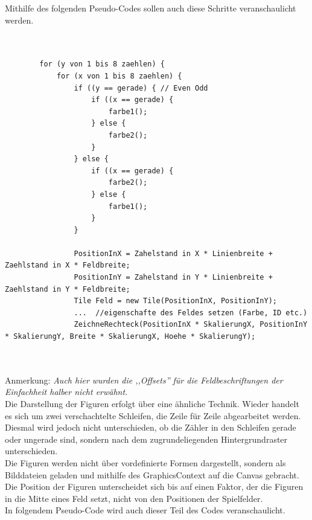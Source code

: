 \documentclass[12pt,a4paper]{article}
\begin{document}
Mithilfe des folgenden Pseudo-Codes sollen auch diese Schritte veranschaulicht werden.
\lstset{language=java}
\begin{lstlisting}

	
		for (y von 1 bis 8 zaehlen) {
			for (x von 1 bis 8 zaehlen) {
				if ((y == gerade) { // Even Odd
					if ((x == gerade) {
						farbe1();
					} else {
						farbe2();
					}
				} else {
					if ((x == gerade) {
						farbe2();
					} else {
						farbe1();
					}
				}
				
				PositionInX = Zahelstand in X * Linienbreite + Zaehlstand in X * Feldbreite;
				PositionInY = Zahelstand in Y * Linienbreite + Zaehlstand in Y * Feldbreite;
				Tile Feld = new Tile(PositionInX, PositionInY);
 				...  //eigenschafte des Feldes setzen (Farbe, ID etc.)
				ZeichneRechteck(PositionInX * SkalierungX, PositionInY * SkalierungY, Breite * SkalierungX, Hoehe * SkalierungY);

	
\end{lstlisting}
Anmerkung: \textit{Auch hier wurden die ,,Offsets'' für die Feldbeschriftungen der Einfachheit halber nicht erwähnt.}\\[2ex]
Die Darstellung der Figuren erfolgt über eine ähnliche Technik. Wieder handelt es sich um zwei verschachtelte Schleifen, die Zeile für Zeile abgearbeitet werden. Diesmal wird jedoch nicht unterschieden, ob die Zähler in den Schleifen gerade oder ungerade sind, sondern nach dem zugrundeliegenden Hintergrundraster unterschieden.\\
Die Figuren werden nicht über vordefinierte Formen dargestellt, sondern als Bilddateien geladen und mithilfe des GraphicsContext auf die Canvas gebracht. Die Position der Figuren unterscheidet sich bis auf einen Faktor, der die Figuren in die Mitte eines Feld setzt, nicht von den Positionen der Spielfelder. \\[2ex]
In folgendem Pseudo-Code wird auch dieser Teil des Codes veranschaulicht.
\lstset{language=java}
\end{document}
